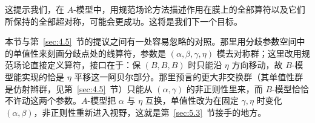 这提示我们，在 $A$-模型中，用规范场论方法描述作用在膜上的全部算符以及它们所保持的全部超对称，可能会更成功。这将是我们下一个目标。

\begin{yizhu}[物理图像补充]
本节与第~\ref{sec:4.5}~节的提议之间有一处容易忽略的对照。那里用分歧参数空间中的单值性来刻画分歧点处的线算符，参数是 $(\alpha,\beta,\gamma,\eta)$ 模去对称群；这里改用规范场论直接定义算符，接口在于：保 $(B,B,B)$ 时只能沿 $\eta$ 方向移动，故 $B$-模型能实现的恰是 $\eta$ 平移这一阿贝尔部分。那里预言的更大非交换群（其单值性群是仿射辫群，见第~\ref{sec:4.5}~节）只能从 $(\alpha,\gamma)$ 的非正则性里来，而 $B$-模型恰恰不许动这两个参数。$A$-模型把 $\alpha$ 与 $\eta$ 互换，单值性改为在固定 $\gamma,\eta$ 时变化 $(\alpha,\beta)$，非正则性重新进入视野，这就是第~\ref{sec:5.3}~节接手的地方。
\end{yizhu}
